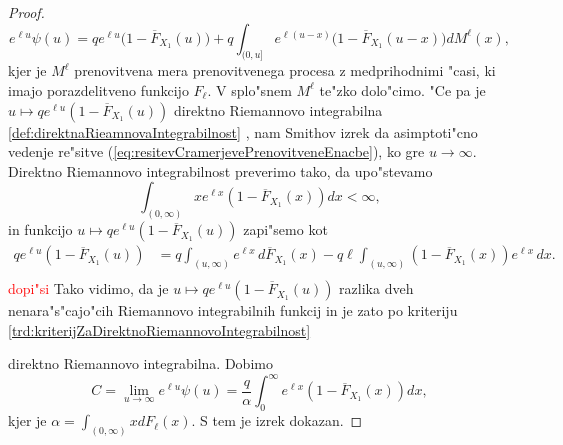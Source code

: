 \documentclass[12pt, a4paper, reqno]{amsart}
\theoremstyle{definition}
\theoremstyle{plain}
\newcommand{\1}{\mathds{1}}
\newcommand*{\refPriloga}[1]{%
  \begingroup
    \hypersetup{
      linkcolor=red,
      linkbordercolor=red,
    }%
    \ref{#1}%
  \endgroup
}
\begin{document}
\begin{proof}
                \begin{equation}
                    e^{\ell u}\psi(u) =qe^{\ell u}\bigl(1 - \overline{F}_{X_1}(u)\bigr) +  q\int_{(0, u]}e^{\ell(u - x)}\bigl(1 - \overline{F}_{X_1}(u - x)\bigr)dM^{\ell}(x),
                    \label{eq:resitevCramerjevePrenovitveneEnacbe}
                \end{equation}
                kjer je $M^{\ell}$ prenovitvena mera prenovitvenega procesa z medprihodnimi "casi, 
                ki imajo porazdelitveno funkcijo $F_\ell$. V splo"snem $M^{\ell}$ te"zko dolo"cimo. 
                "Ce pa je $u\mapsto qe^{\ell u}(1 - \overline{F}_{X_1}(u))$ direktno Riemannovo integrabilna
                \refPriloga{def:direktnaRieamnovaIntegrabilnost}, nam 
                Smithov izrek da asimptoti"cno vedenje re"sitve (\ref{eq:resitevCramerjevePrenovitveneEnacbe}),
                ko gre $u\to\infty$.
                Direktno Riemannovo integrabilnost preverimo tako, da upo"stevamo 
                \begin{equation*}
                    \int_{(0, \infty)}xe^{\ell x}(1 - \overline{F}_{X_1}(x))dx < \infty, 
                \end{equation*}
                in funkcijo $u\mapsto qe^{\ell u}(1 - \overline{F}_{X_1}(u))$ zapi"semo kot
                \begin{align*}
                    qe^{\ell u}(1 - \overline{F}_{X_1}(u))
                     &= q\int_{(u, \infty)}e^{\ell x}\, d\overline{F}_{X_1}(x) 
                        - q\ell \int_{(u, \infty)}(1 - \overline{F}_{X_1}(x))e^{\ell x}\, dx. \\                                  
                \end{align*}
                \textcolor{red}{dopi"si}
                Tako vidimo, da je $u\mapsto qe^{\ell u}(1 - \overline{F}_{X_1}(u))$ razlika dveh nenara"s"cajo"cih
                Riemannovo integrabilnih funkcij in je zato po kriteriju \refPriloga{trd:kriterijZaDirektnoRiemannovoIntegrabilnost} 
                direktno Riemannovo integrabilna. Dobimo 
                \begin{equation}
                    C = \lim_{u\to\infty}e^{\ell u}\psi(u) =  \frac{q}{\alpha} \int_0^\infty e^{\ell x}(1 - \overline{F}_{X_1}(x))dx,
                    \label{eq:CramerBoundConstant}
                \end{equation}
                kjer je $\alpha = \int_{(0, \infty)}x dF_\ell(x)$. S tem je izrek dokazan.
            \end{proof}
\end{document}
